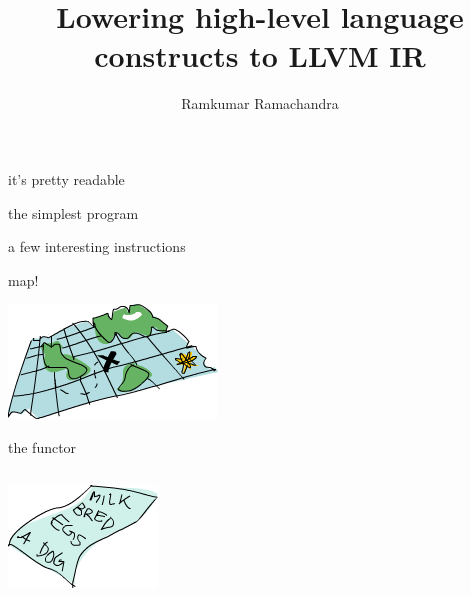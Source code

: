 \documentclass{beamer}
\title{Lowering high-level language constructs to LLVM IR}
\author{Ramkumar Ramachandra}
\begin{document}
\begin{frame}
  \titlepage
\end{frame}

\begin{frame}{it's pretty readable}
  
  
\end{frame}

\begin{frame}{the simplest program}
  
  
\end{frame}

\begin{frame}{a few interesting instructions}
  
  
\end{frame}

\begin{frame}{map!}
  \begin{center}\includegraphics[scale=0.6]{map}\end{center}
  \vfill
  
\end{frame}

\begin{frame}{the functor}
  \begin{columns}
    \begin{column}[b]{5.5cm}
      \includegraphics[scale=0.6]{list}
    \end{column}
    \begin{column}[b]{4.5cm}
      
    \end{column}
  \end{columns}
\end{frame}
\end{document}
